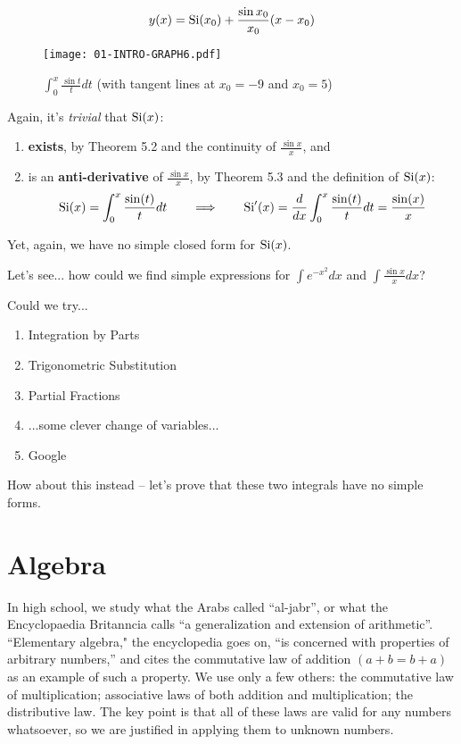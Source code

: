 $$ y(x) = {\rm Si}(x_0) + \frac{\sin x_0}{x_0}(x-x_0)$$

\begin{figure}[H]
\begin{center}
\texttt{[image: 01-INTRO-GRAPH6.pdf]}
\end{center}
\caption{$\int_0^x \frac{\sin t}{t} dt$ (with tangent lines at $x_0=-9$ and $x_0=5$)}
\end{figure}

Again, it's {\it trivial} that ${\rm Si}(x)$:

\begin{enumerate}
\item {\bf exists}, by Theorem 5.2 and the continuity of $\frac{\sin x}{x}$, and
\item is an {\bf anti-derivative} of $\frac{\sin x}{x}$, by Theorem 5.3 and the definition of ${\rm Si}(x)$:
$${\rm Si}(x) = \int_0^x \frac{\sin(t)}{t} dt \qquad\Longrightarrow\qquad {\rm Si}'(x) = \frac{d}{dx}\int_0^x \frac{\sin(t)}{t} dt = \frac{\sin(x)}{x}$$
\end{enumerate}

Yet, again, we have no simple closed form for ${\rm Si}(x)$.

Let's see... how could we find simple expressions for $\int e^{-x^2} dx$ and $\int \frac{\sin x}{x} dx$?

Could we try...

\begin{enumerate}
\item Integration by Parts
\item Trigonometric Substitution
\item Partial Fractions
\item ...some clever change of variables...
\item Google
\end{enumerate}

How about this instead -- let's prove that these two integrals have no simple forms.


\vfill\eject
\section{Algebra}

In high school, we study what the Arabs called ``al-jabr'', or what
the Encyclopaedia Britanncia calls ``a generalization and extension of
arithmetic''.  ``Elementary algebra," the encyclopedia goes on, ``is
concerned with properties of arbitrary numbers,'' and cites the
commutative law of addition $(a+b=b+a)$ as an example of such a
property.  We use only a few others: the commutative law of
multiplication; associative laws of both addition and multiplication;
the distributive law.  The key point is that all of these laws are
valid for any numbers whatsoever, so we are justified in applying them
to unknown numbers.

